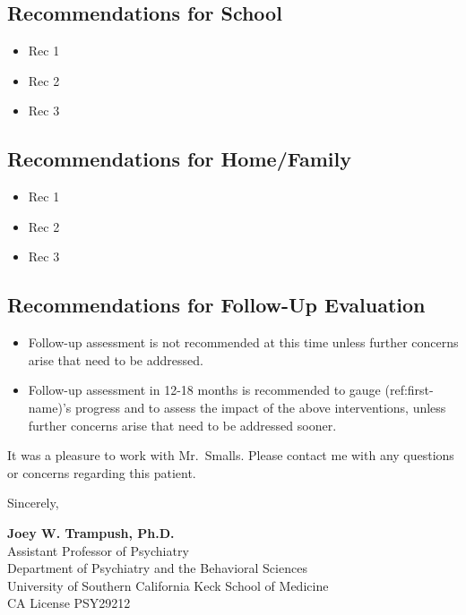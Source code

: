 \documentclass[
  letterpaper,
  DIV=11,
  numbers=noendperiod,
  oneside]{scrartcl}
\providecommand{\tightlist}{%
  \setlength{\itemsep}{0pt}\setlength{\parskip}{0pt}}\usepackage{longtable,booktabs,array}
\begin{document}
\hypertarget{recommendations-for-school}{%
\subsection{Recommendations for
School}\label{recommendations-for-school}}

\begin{itemize}
\tightlist
\item
  Rec 1
\item
  Rec 2
\item
  Rec 3
\end{itemize}

\hypertarget{recommendations-for-homefamily}{%
\subsection{Recommendations for
Home/Family}\label{recommendations-for-homefamily}}

\begin{itemize}
\tightlist
\item
  Rec 1
\item
  Rec 2
\item
  Rec 3
\end{itemize}

\hypertarget{recommendations-for-follow-up-evaluation}{%
\subsection{Recommendations for Follow-Up
Evaluation}\label{recommendations-for-follow-up-evaluation}}

\begin{itemize}
\item
  Follow-up assessment is not recommended at this time unless further
  concerns arise that need to be addressed.
\item
  Follow-up assessment in 12-18 months is recommended to gauge
  (ref:first-name)'s progress and to assess the impact of the above
  interventions, unless further concerns arise that need to be addressed
  sooner.
\end{itemize}

It was a pleasure to work with Mr.~Smalls. Please contact me with any
questions or concerns regarding this patient.

Sincerely,

\textbf{Joey W. Trampush, Ph.D.}\\
Assistant Professor of Psychiatry\\
Department of Psychiatry and the Behavioral Sciences\\
University of Southern California Keck School of Medicine\\
CA License PSY29212
\end{document}

